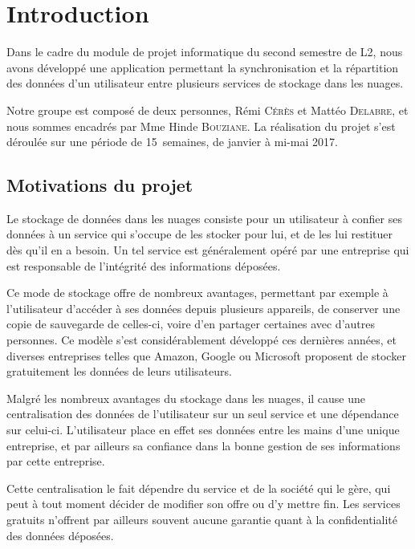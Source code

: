 \chapter*{Introduction}

Dans le cadre du module de projet informatique du second semestre de L2, nous avons développé une application permettant la synchronisation et la répartition des données d'un utilisateur entre plusieurs services de stockage dans les nuages.

Notre groupe est composé de deux personnes, Rémi \textsc{Cérès} et Mattéo \textsc{Delabre}, et nous sommes encadrés par Mme Hinde \textsc{Bouziane}. La réalisation du projet s’est déroulée sur une période de 15~semaines, de
janvier à mi-mai 2017.

\section*{Motivations du projet}

Le stockage de données dans les nuages consiste pour un utilisateur à confier ses données à un service qui s'occupe de les stocker pour lui, et de les lui restituer dès qu'il en a besoin. Un tel service est généralement opéré par une entreprise qui est responsable de l'intégrité des informations déposées.

Ce mode de stockage offre de nombreux avantages, permettant par exemple à l'utilisateur d'accéder à ses données depuis plusieurs appareils, de conserver une copie de sauvegarde de celles-ci, voire d'en partager certaines avec d'autres personnes. Ce modèle s'est considérablement développé ces dernières années, et diverses entreprises telles que Amazon, Google ou Microsoft proposent de stocker gratuitement les données de leurs utilisateurs.

Malgré les nombreux avantages du stockage dans les nuages, il cause une centralisation des données de l'utilisateur sur un seul service et une dépendance sur celui-ci. L'utilisateur place en effet ses données entre les mains d'une unique entreprise, et par ailleurs sa confiance dans la bonne gestion de ses informations par cette entreprise.

Cette centralisation le fait dépendre du service et de la société qui le gère, qui peut à tout moment décider de modifier son offre ou d'y mettre fin. Les services gratuits n'offrent par ailleurs souvent aucune garantie quant à la confidentialité des données déposées.

